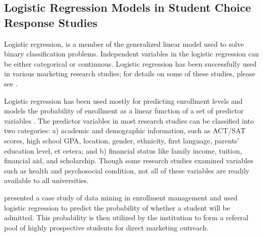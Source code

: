 \documentclass[12pt,english]{report}
\begin{document}
\subsection{Logistic Regression Models in Student Choice Response Studies}

Logistic regression,  is a member of the generalized linear model used to solve binary classification problems. Independent variables  in the logistic regression can be either categorical or continuous. %
Logistic regression has been successfully used in various marketing research studies; for details on some of these studies, please see \citep{Hosmer2013}.

\vspace{0.15in}
Logistic regression has been used mostly for predicting enrollment levels and models the probability of enrollment as a linear function of a set of predictor variables \citep{lr_summary}. The predictor  variables in most research studies can be classified into two categories: a) academic and demographic information, such as ACT/SAT scores, high school GPA, location, gender, ethnicity, first language, parents' education level, et cetera; and b) financial status like family income, tuition, financial aid, and scholarship. Though some research studies examined variables such as health and psychosocial condition, not all of these variables are readily available to all universities.

\citet{lr_1_chang} presented a case study of data mining in enrollment management and used logistic regression to predict the probability of whether a student will be admitted. This probability is then utilized by the institution to form a referral pool of highly prospective students for direct marketing outreach.
\end{document}

